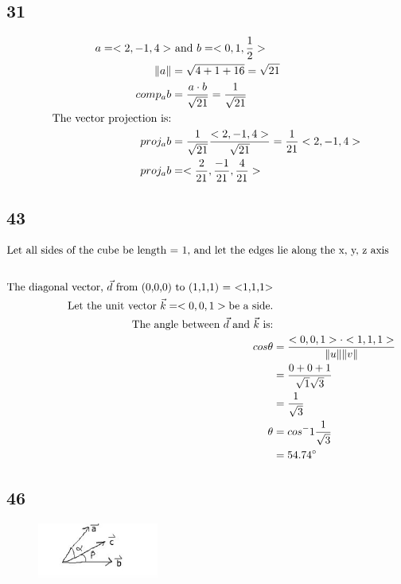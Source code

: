 \documentclass{article}%
\begin{document}
%
\subsection*{31}%
\begin{alignat*}{2}%
a = <2,-1,4> & \textnormal{ and } b = <0,1,\frac{1}{2}>\\%
\| a \| &= \sqrt{4+1+16} = \sqrt{21}\\%
comp_a b &= \frac{a \cdot b}{\sqrt{21}} = \frac{1}{\sqrt{21}}\\%
\textnormal{The vector projection is:}\\%
proj_a b &= \frac{1}{\sqrt{21}}\frac{<2,-1,4>}{\sqrt{21}} = \frac{1}{21}<2,-1,4>\\%
proj_a b &= <\frac{2}{21},\frac{-1}{21},\frac{4}{21}>\\%
\end{alignat*}

%
\subsection*{43}%
\begin{alignat*}{2}%
\intertext{Let all sides of the cube be length = 1, and let the edges lie along the x, y, z axis}\\%
\text{The diagonal vector, }\vec{d}\text{ from (0,0,0) to (1,1,1) = <1,1,1>}\\%
\text{Let the unit vector } \vec{k} = <0,0,1> \text{be a side.}\\%
\text{The angle between } \vec{d} \text{ and } \vec{k} \text{ is:}\\%
cos\theta &= \frac{<0,0,1> \cdot <1,1,1>}{\|u\|\|v\|}\\%
&= \frac{0+0+1}{\sqrt{1}\sqrt{3}}\\%
&= \frac{1}{\sqrt{3}} \\%
\theta &= cos^-1 \frac{1}{\sqrt{3}}\\%
&= 54.74^\circ%
\end{alignat*}

%
\subsection*{46}%


\begin{figure}[h!]%
\centering%
\includegraphics[width=150px]{ang1.jpg}%
\end{figure}
\end{document}
